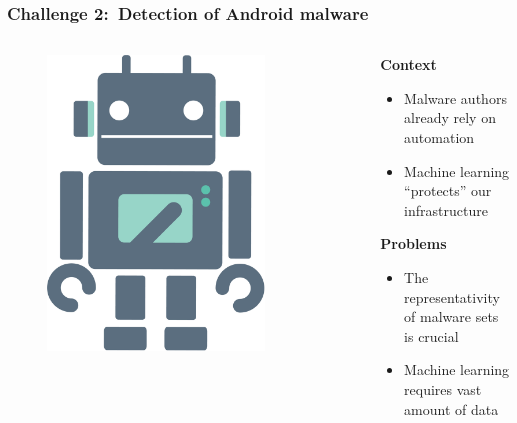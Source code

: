 \begin{frame}
    \frametitle{Challenge 2:~Detection of Android malware}

    \begin{columns}
        \begin{column}{0.3\textwidth}
            \begin{figure}[!ht]
                \includegraphics[width=0.8\textwidth]{figures/introduction/detection.jpg}
            \end{figure}
        \end{column}

        \begin{column}{0.8\textwidth}
            \begin{block}{}
                \centering
                \textbf{Context}
            \end{block}
            \begin{itemize}
                \item Malware authors already rely on automation
                \item Machine learning ``protects'' our infrastructure
            \end{itemize}

            \begin{block}{}
                \centering
                \textbf{Problems}
            \end{block}
            \begin{itemize}
                \item The representativity of malware sets is crucial
                \item Machine learning requires vast amount of data
            \end{itemize}


\end{column}
\end{columns}
\end{frame}
